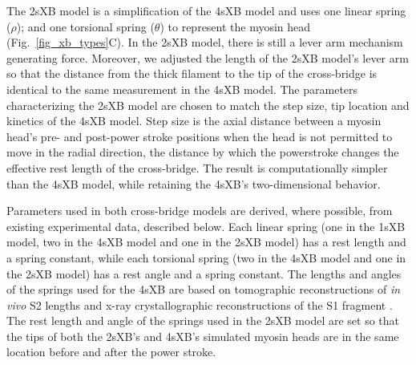\documentclass[]{article}
\begin{document}
The 2sXB model is a simplification of the 4sXB model and uses one linear spring ($\rho$); and one torsional spring ($\theta$) to represent the myosin head (Fig.~\ref{fig_xb_types}C). 
In the 2sXB model, there is still a lever arm mechanism generating force.  
Moreover, we adjusted the length of the 2sXB model's lever arm so that the distance from the thick filament to the tip of the cross-bridge is identical to the same measurement in the 4sXB model.
The parameters characterizing the 2sXB model are chosen to match the step size, tip location and kinetics of the 4sXB model. 
Step size is the axial distance between a myosin head's pre- and post-power stroke positions when the head is not permitted to move in the radial direction, the distance by which the powerstroke changes the effective rest length of the cross-bridge. 
The result is computationally simpler than the 4sXB model, while retaining the 4sXB's two-dimensional behavior.

Parameters used in both cross-bridge models are derived, where possible, from existing experimental data, described below.  
Each linear spring (one in the 1sXB model, two in the 4sXB model and one in the 2sXB model) has a rest length and a spring constant, while each torsional spring (two in the 4sXB model and one in the 2sXB model) has a rest angle and a spring constant. 
The lengths and angles of the springs used for the 4sXB are based on tomographic reconstructions of \emph{in vivo} S2 lengths and x-ray crystallographic reconstructions of the S1 fragment \citep{Taylor1999, Rayment1993}.
The rest length and angle of the springs used in the 2sXB model are set so that the tips of both the 2sXB's and 4sXB's simulated myosin heads are in the same location before and after the power stroke.
\end{document}
